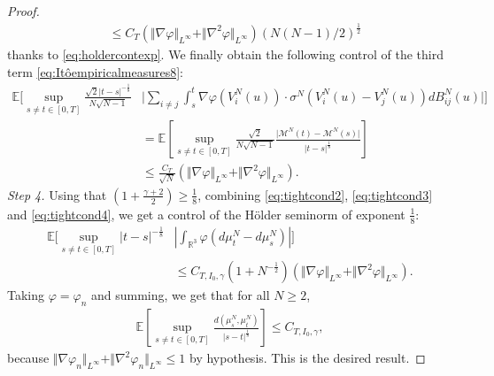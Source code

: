 \documentclass[11pt,a4paper]{article}
\theoremstyle{definition}
\theoremstyle{plain}
\begin{document}
\begin{proof}
\begin{align*}
    &\leq C_T(\Vert \nabla \varphi\Vert_{L^\infty}+\Vert \nabla^2 \varphi\Vert_{L^\infty}) (N(N-1)/2)^{\frac{1}{2}}
\end{align*}
thanks to \eqref{eq:holdercontexp}. We finally obtain the following control of the third term \eqref{eq:Itôempiricalmeasures8}:
\begin{align}
         \mathbb{E}\Bigg[\sup_{s\neq t \in [0,T]}\frac{\sqrt{2}\vert t-s\vert^{-\frac{1}{8}}}{N\sqrt{N-1}}&\Bigg\vert \sum_{i\neq j} \int_s^t  \nabla \varphi\left(V^N_i(u)\right)\cdot \sigma^N \left(V^N_i(u) - V^N_j(u)\right)dB^N_{ij}(u)\Bigg\vert\Bigg]\nonumber\\
    &= \mathbb{E}\left[\sup_{s\neq t \in [0,T]}\frac{\sqrt{2}}{N\sqrt{N-1}} \frac{\vert \mathcal{M}^N(t)-\mathcal{M}^N(s)\vert}{\vert t-s\vert^{\frac{1}{8}}}\right]\nonumber\\
    \label{eq:tightcond4}
    &\leq  \frac{C_T}{\sqrt{N}}(\Vert \nabla \varphi\Vert_{L^\infty}+\Vert \nabla^2 \varphi\Vert_{L^\infty}).
\end{align}
\textit{Step 4.} Using that $(1+\frac{\gamma+2}{2})\geq \frac{1}{8}$, combining \eqref{eq:tightcond2}, \eqref{eq:tightcond3} and \eqref{eq:tightcond4}, we get a control of the Hölder seminorm of exponent $\frac{1}{8}$:
\begin{align*}
   \mathbb{E}\bigg[ \sup_{s\neq t \in [0,T]}\vert t-s\vert^{-\frac{1}{8}}&\left\vert \int_{\mathbb{R}^3} \varphi (d\mu^N_t-d\mu^N_s)\right\vert \bigg]\\
    &\leq C_{T,I_0,\gamma}(1+N^{-\frac{1}{2}} )(\Vert \nabla \varphi\Vert_{L^\infty}+\Vert \nabla^2 \varphi\Vert_{L^\infty}).
\end{align*}
Taking $\varphi=\varphi_n$ and summing, we get that for all $N\geq 2$,
\begin{align*}
   \mathbb{E}\left[  \sup_{s\neq t\in[0,T]} \frac{d(\mu^N_s,\mu^N_t)}{\vert s-t \vert^\frac{1}{8}} \right]\leq C_{T,I_0,\gamma},
\end{align*}
because $\Vert \nabla \varphi_n\Vert_{L^\infty}+\Vert \nabla^2 \varphi_n\Vert_{L^\infty}\leq 1$ by hypothesis. This is the desired result.
\end{proof}
\end{document}

